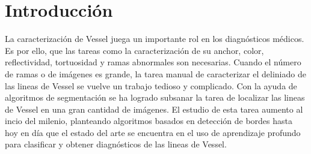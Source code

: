 \section{Introducción}

La caracterización de Vessel juega un importante rol en los diagnósticos médicos. Es por ello, que las tareas como la caracterización de su anchor, color, reflectividad, tortuosidad y ramas abnormales son necesarias. Cuando el número de ramas o de imágenes es grande, la tarea manual de caracterizar el deliniado de las lineas de Vessel se vuelve un trabajo tedioso y complicado. Con la ayuda de algoritmos de segmentación se ha logrado subsanar la tarea de localizar las lineas de Vessel en una gran cantidad de imágenes. El estudio de esta tarea aumento al incio del milenio, planteando algoritmos basados en detección de bordes\cite{Staal_2004} hasta hoy en día que el estado del arte se encuentra en el uso de aprendizaje profundo\cite{Abber_2022} para clasificar y obtener diagnósticos de las lineas de Vessel.